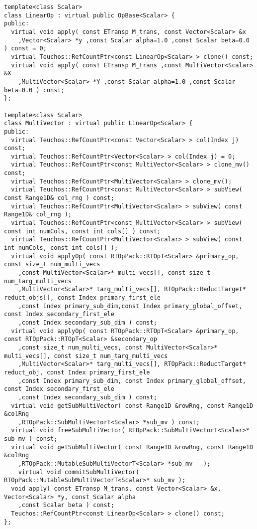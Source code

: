 {\begin{verbatim}
template<class Scalar>
class LinearOp : virtual public OpBase<Scalar> {
public:
  virtual void apply( const ETransp M_trans, const Vector<Scalar> &x
    ,Vector<Scalar> *y ,const Scalar alpha=1.0 ,const Scalar beta=0.0 ) const = 0;
  virtual Teuchos::RefCountPtr<const LinearOp<Scalar> > clone() const;
  virtual void apply( const ETransp M_trans ,const MultiVector<Scalar> &X
    ,MultiVector<Scalar> *Y ,const Scalar alpha=1.0 ,const Scalar beta=0.0 ) const;
};

template<class Scalar>
class MultiVector : virtual public LinearOp<Scalar> {
public:
  virtual Teuchos::RefCountPtr<const Vector<Scalar> > col(Index j) const;
  virtual Teuchos::RefCountPtr<Vector<Scalar> > col(Index j) = 0;
  virtual Teuchos::RefCountPtr<const MultiVector<Scalar> > clone_mv() const;
  virtual Teuchos::RefCountPtr<MultiVector<Scalar> > clone_mv();
  virtual Teuchos::RefCountPtr<const MultiVector<Scalar> > subView( const Range1D& col_rng ) const;
  virtual Teuchos::RefCountPtr<MultiVector<Scalar> > subView( const Range1D& col_rng );
  virtual Teuchos::RefCountPtr<const MultiVector<Scalar> > subView( const int numCols, const int cols[] ) const;
  virtual Teuchos::RefCountPtr<MultiVector<Scalar> > subView( const int numCols, const int cols[] );
  virtual void applyOp( const RTOpPack::RTOpT<Scalar> &primary_op, const size_t num_multi_vecs
    ,const MultiVector<Scalar>* multi_vecs[], const size_t num_targ_multi_vecs
    ,MultiVector<Scalar>* targ_multi_vecs[], RTOpPack::ReductTarget* reduct_objs[], const Index primary_first_ele
    ,const Index primary_sub_dim,const Index primary_global_offset, const Index secondary_first_ele
    ,const Index secondary_sub_dim ) const;
  virtual void applyOp( const RTOpPack::RTOpT<Scalar> &primary_op, const RTOpPack::RTOpT<Scalar> &secondary_op
    ,const size_t num_multi_vecs, const MultiVector<Scalar>* multi_vecs[], const size_t num_targ_multi_vecs
    ,MultiVector<Scalar>* targ_multi_vecs[], RTOpPack::ReductTarget* reduct_obj, const Index primary_first_ele
    ,const Index primary_sub_dim, const Index primary_global_offset, const Index secondary_first_ele
    ,const Index secondary_sub_dim ) const;
  virtual void getSubMultiVector( const Range1D &rowRng, const Range1D &colRng
    ,RTOpPack::SubMultiVectorT<Scalar> *sub_mv ) const;
  virtual void freeSubMultiVector( RTOpPack::SubMultiVectorT<Scalar>* sub_mv ) const;
  virtual void getSubMultiVector( const Range1D &rowRng, const Range1D &colRng
    ,RTOpPack::MutableSubMultiVectorT<Scalar> *sub_mv	);
	virtual void commitSubMultiVector( RTOpPack::MutableSubMultiVectorT<Scalar>* sub_mv );
  void apply( const ETransp M_trans, const Vector<Scalar> &x, Vector<Scalar> *y, const Scalar alpha
    ,const Scalar beta ) const;
  Teuchos::RefCountPtr<const LinearOp<Scalar> > clone() const;
};


\end{verbatim}}

